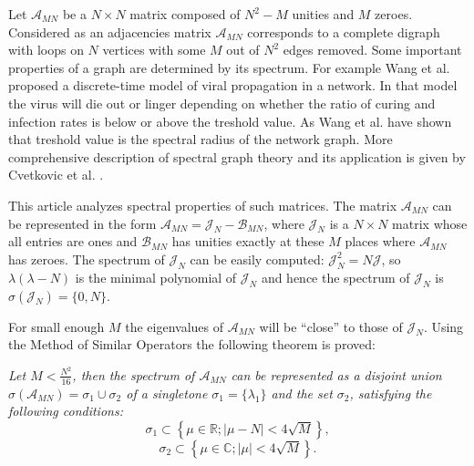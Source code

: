 Let \( \mathscr{A}_{MN} \) be a \( N\times N \) matrix composed of
\( N^2 - M \) unities and \( M \) zeroes.
Considered as an adjacencies matrix \( \mathscr{A}_{MN} \)
corresponds to a complete digraph with loops on \( N \) vertices
with some \( M \) out of \( N^2 \) edges removed.
Some important properties of a graph are determined by its spectrum.
For example Wang et al. \cite{epidemic} proposed a discrete-time model
of viral propagation in a network.
In that model the virus will die out or linger
depending on whether the ratio of curing and infection rates
is below or above the treshold value.
As Wang et al. have shown that treshold value
is the spectral radius of the network graph.
More comprehensive description of spectral graph theory
and its application is given by Cvetkovic et al. \cite{cvet}.

This article analyzes spectral properties of such matrices.
The matrix \( \mathscr{A}_{MN} \) can be represented in the form
\( \mathscr{A}_{MN} = \mathcal{J}_N - \mathscr{B}_{MN} \),
where \( \mathcal{J}_N \) is a \( N\times N \) matrix
whose all entries are ones
and \( \mathcal{B}_{MN} \) has unities exactly at these \( M \)
places where \( \mathscr{A}_{MN} \) has zeroes.
The spectrum of \( \mathcal{J}_N \) can be easily computed:
\( \mathcal{J}_N^2 = N \mathcal{J} \),
so \( \lambda(\lambda - N) \) is the minimal polynomial of \( \mathcal{J}_N \)
and hence the spectrum of \( \mathcal{J}_{N} \) is
\( \sigma(\mathcal{J}_N) = \{ 0,N \} \).

For small enough \( M \) the eigenvalues of \( \mathscr{A}_{MN} \)
will be ``close'' to those of \( \mathcal{J}_N \).
Using the Method of Similar Operators \cite{baskakov-harmonic,baskakov-split}
the following theorem is proved:
\begin{center}
\it
    Let \( M < \frac{N^2}{16} \),
    then the spectrum of \( \mathscr{A}_{MN} \) can be represented as a disjoint union
    \( \sigma\left(\mathscr{A}_{MN}\right) = \sigma_1 \cup \sigma_2 \)
    of a singletone \( \sigma_1=\{\lambda_1\} \)
    and the set \( \sigma_2 \), satisfying the following conditions:
    \[ \sigma_1 \subset \left\{ \mu\in\mathbb{R}; \lvert \mu - N \rvert < 4\sqrt{M} \right\}, \]
    \[ \sigma_2 \subset \left\{ \mu\in\mathbb{C}; \lvert \mu \rvert < 4\sqrt{M} \right\}. \]
\end{center}
